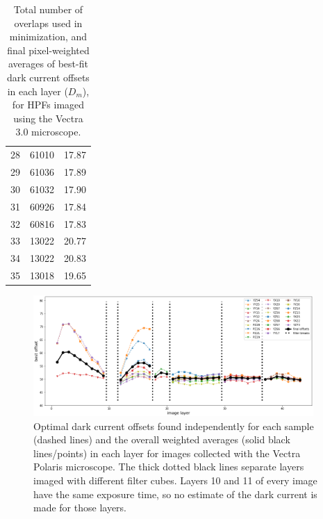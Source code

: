 \documentclass[letterpaper,11pt]{article}
\begin{document}
\begin{table}[!htb]
\begin{tabular}{c c c}
28              & 61010              & 17.87 \\
29              & 61036              & 17.89 \\
30              & 61032              & 17.90 \\
31              & 60926              & 17.84 \\
32              & 60816              & 17.83 \\
33              & 13022              & 20.77 \\
34              & 13022              & 20.83 \\
35              & 13018              & 19.65 \\
\hline
\end{tabular}
\caption{\footnotesize Total number of overlaps used in minimization, and final pixel-weighted averages of best-fit dark current offsets in each layer ($D_{m}$), for HPFs imaged using the Vectra 3.0 microscope.}
\label{tab:best_offsets_vectra}
\end{table}

\begin{figure}[!ht]
\centering
\includegraphics[width=0.95\textwidth]{images/results/dark_current_offsets_polaris}
\caption{\footnotesize Optimal dark current offsets found independently for each sample (dashed lines) and the overall weighted averages (solid black lines/points) in each layer for images collected with the Vectra Polaris microscope. The thick dotted black lines separate layers imaged with different filter cubes. Layers 10 and 11 of every image have the same exposure time, so no estimate of the dark current is made for those layers.}
\label{fig:dark_current_offsets_polaris}
\end{figure}
\end{document}
